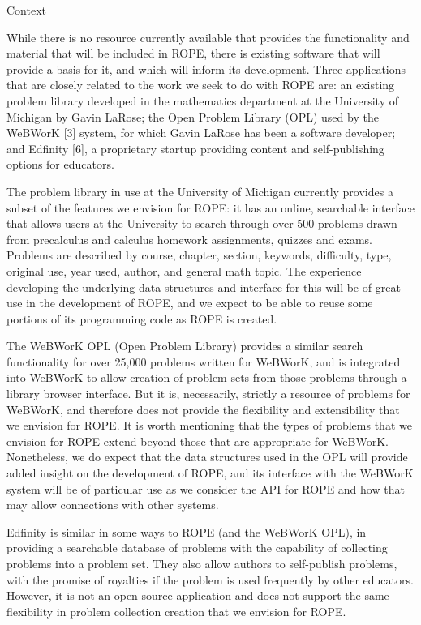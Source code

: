 \documentclass[11pt]{article}
\begin{document}
\begin{section}{Context}

While there is no resource currently available that provides the
functionality and material that will be included in ROPE,
there is existing software that will provide a
basis for it, and which will inform its development.  Three applications
that are closely related to the work we seek to do with ROPE are: an
existing problem library developed in the mathematics department at the
University of Michigan by Gavin LaRose; the Open Problem Library (OPL)
used by the WeBWorK [3] %
system, for which Gavin LaRose has been a software developer; and
Edfinity [6], a proprietary startup providing content and self-publishing
options for educators.

The problem library in use at the University of Michigan currently
provides a subset of the features we envision for ROPE: it has an
online, searchable interface that allows users at the University to
search through over 500 problems drawn from precalculus and calculus
homework assignments, quizzes and exams.  Problems are described by
course, chapter, section, keywords, difficulty, type, original use, year
used, author, and general math topic.  The experience developing the
underlying data structures and interface for this will be of great use in
the development of ROPE, and we expect to be able to reuse some
portions of its programming code as ROPE is created.  

The WeBWorK OPL (Open Problem Library)
provides a similar search functionality for over 25,000 problems written
for WeBWorK, and is integrated into WeBWorK to allow creation of problem
sets from those problems through a library browser interface.  But it is,
necessarily, strictly a resource of problems for WeBWorK, and
therefore does not provide the flexibility and extensibility that we
envision for ROPE.  It is worth mentioning that the types of problems that we envision for ROPE extend beyond those that are appropriate for WeBWorK.  Nonetheless, we do expect that the data structures
used in the OPL will provide added insight on the development 
of ROPE, and its interface with the WeBWorK system will be of
particular use as we consider the API for ROPE and how that may allow
connections with other systems.  

Edfinity is similar in some ways to ROPE (and the WeBWorK OPL), in
providing a searchable database of problems with the capability of 
collecting problems into a problem set.  They also allow authors to 
self-publish problems, with the promise of royalties if the problem is
used frequently by other educators.  However, it is not an open-source
application and does not support the same flexibility in problem
collection creation that we envision for ROPE.


\end{section}
\end{document}
